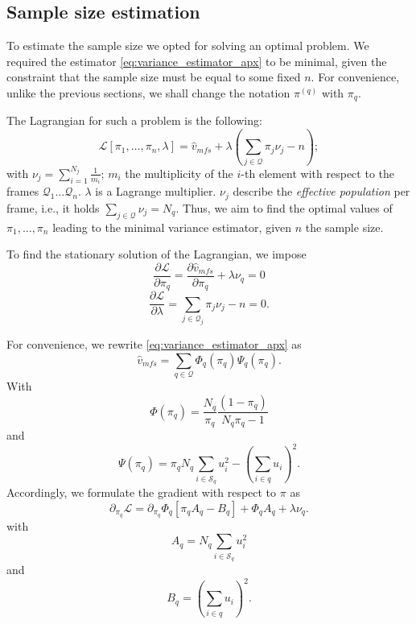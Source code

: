 \begin{appendices}
\subsection{Sample size estimation} \label{sec:vincolo_popolazione}
To estimate the sample size we opted for solving an optimal problem.
We required the estimator \eqref{eq:variance_estimator_apx} to be minimal, given the constraint that the sample size must be equal to some fixed $n$.
For convenience, unlike the previous sections, we shall change the notation $\pi^{(q)}$ with $\pi_{q}.$ 

The Lagrangian for such a problem is the following:
\begin{equation}
    \mathcal{L}[\pi_{1}, \dots, \pi_{n}, \lambda] = \hat{v}_{mfs} + \lambda \left(\sum_{j \in \mathcal{Q}}\pi_{j} \nu_{j}-n \right);
\end{equation}
with $\nu_{j} = \sum_{i = 1}^{N_{j}}\frac{1}{m_{i}}$; $m_i$ the multiplicity of the $i$-th element with respect to the frames  $\mathcal{Q}_1 \dots \mathcal{Q}_n$.
$\lambda$ is a Lagrange multiplier.
$\nu_{j}$ describe the \emph{effective population} per frame, i.e., it holds
$\sum_{j \in \mathcal{Q}} \nu_{j} = N_{q}.$ 
Thus, we aim to find the optimal values of $\pi_1, \dots, \pi_n$ leading to the minimal variance estimator, given $n$ the sample size.

To find the stationary solution of the Lagrangian, we impose
\begin{equation}\label{eq:grad_lagrangian_pi}
\frac{\partial \mathcal{L}}{\partial \pi_{q}} = \frac{\partial \hat{v}_{mfs}}{\partial \pi_{q}} + \lambda \nu_q = 0
\end{equation}
\begin{equation}\label{eq:grad_lagrangian_multiplier}
    \frac{\partial \mathcal{L}}{\partial \lambda} = \sum_{j\in\mathcal{Q}_j}\pi_j \nu_j -n = 0.
\end{equation}

For convenience, we rewrite \eqref{eq:variance_estimator_apx} as 
$$\hat{v}_{mfs} = \sum_{q \in \mathcal{Q}} \Phi_q(\pi_q)\Psi_q(\pi_q).$$ 
With
$$\Phi(\pi_q)=  \frac{N_q}{\pi_{q}}\frac{(1-\pi_{q})}{N_{q}\pi_{q}-1}$$
and $$\Psi(\pi_q)= \pi_{q}N_q\sum_{i\in \mathcal{S}_{q}} u_{i}^{2} -\left(\sum_{i\in q} u_{i}\right)^{2}.$$
Accordingly, we formulate the gradient with respect to $\pi$ as
$$\partial_{\pi_q}\mathcal{L} = \partial_{\pi_q}\Phi_{q} \left[\pi_q A_q - B_q\right] + \Phi_q A_q +\lambda \nu_q.$$
with $$A_q = N_q\sum_{i\in \mathcal{S}_{q}} u_{i}^{2}$$
and
$$B_q = \left(\sum_{i\in q} u_{i}\right)^{2}.$$


\end{appendices}
